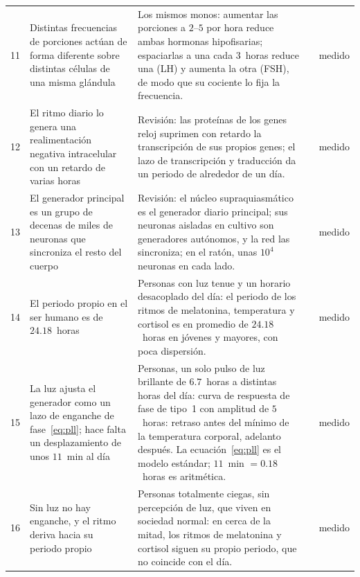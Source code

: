 {\begin{longtable}{>{\raggedright}p{0.5cm}>{\raggedright}p{4.0cm}>{\raggedright}p{5.6cm}>{\raggedright}p{2.3cm}>{\raggedright\arraybackslash}p{1.7cm}}
11 & Distintas frecuencias de porciones actúan de forma diferente sobre distintas células de una misma glándula & Los mismos monos: aumentar las porciones a $2$--$5$ por hora reduce ambas hormonas hipofisarias; espaciarlas a una cada $3$~horas reduce una (LH) y aumenta la otra (FSH), de modo que su cociente lo fija la frecuencia. & \cite{Wildt1981gnrh} & medido \\
12 & El ritmo diario lo genera una realimentación negativa intracelular con un retardo de varias horas & Revisión: las proteínas de los genes reloj suprimen con retardo la transcripción de sus propios genes; el lazo de transcripción y traducción da un periodo de alrededor de un día. & \cite{TakahashiJS2017} & medido \\
13 & El generador principal es un grupo de decenas de miles de neuronas que sincroniza el resto del cuerpo & Revisión: el núcleo supraquiasmático es el generador diario principal; sus neuronas aisladas en cultivo son generadores autónomos, y la red las sincroniza; en el ratón, unas $10^4$ neuronas en cada lado. & \cite{Welsh2010scn} & medido \\
14 & El periodo propio en el ser humano es de $24.18$~horas & Personas con luz tenue y un horario desacoplado del día: el periodo de los ritmos de melatonina, temperatura y cortisol es en promedio de $24.18$~horas en jóvenes y mayores, con poca dispersión. & \cite{Czeisler1999} & medido \\
15 & La luz ajusta el generador como un lazo de enganche de fase~\eqref{eq:pll}; hace falta un desplazamiento de unos $11$~min al día & Personas, un solo pulso de luz brillante de $6.7$~horas a distintas horas del día: curva de respuesta de fase de tipo~1 con amplitud de $5$~horas: retraso antes del mínimo de la temperatura corporal, adelanto después. La ecuación~\eqref{eq:pll} es el modelo estándar; $11$~min $=0.18$~horas es aritmética. & \cite{Khalsa2003prc} & medido \\
16 & Sin luz no hay enganche, y el ritmo deriva hacia su periodo propio & Personas totalmente ciegas, sin percepción de luz, que viven en sociedad normal: en cerca de la mitad, los ritmos de melatonina y cortisol siguen su propio periodo, que no coincide con el día. & \cite{Sack1992blind} & medido \\
\bottomrule
\end{longtable}}
